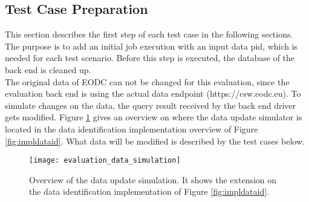 \documentclass[draft,final]{vutinfth} %
\begin{document}
\subsection*{Test Case Preparation}
This section describes the first step of each test case in the following sections. The purpose is to add an initial job execution with an input data pid, which is needed for each test scenario. Before this step is executed, the database of the back end is cleaned up.\\ The original data of EODC can not be changed for this evaluation, since the evaluation back end is using the actual data endpoint (https://csw.eodc.eu). To simulate changes on the data, the query result received by the back end driver gets modified. Figure \ref{fig:eva_data_simulation} gives an overview on where the data update simulator is located in the data identification implementation overview of Figure \ref{fig:impldataid}. What data will be modified is described by the test cases below. \\

\begin{figure}[h]
	\centering
	\texttt{[image: evaluation\_data\_simulation]}
	\caption{Overview of the data update simulation. It shows the extension on the data identification implementation of Figure \ref{fig:impldataid}.}
	\label{fig:eva_data_simulation} %
\end{figure}
\end{document}
